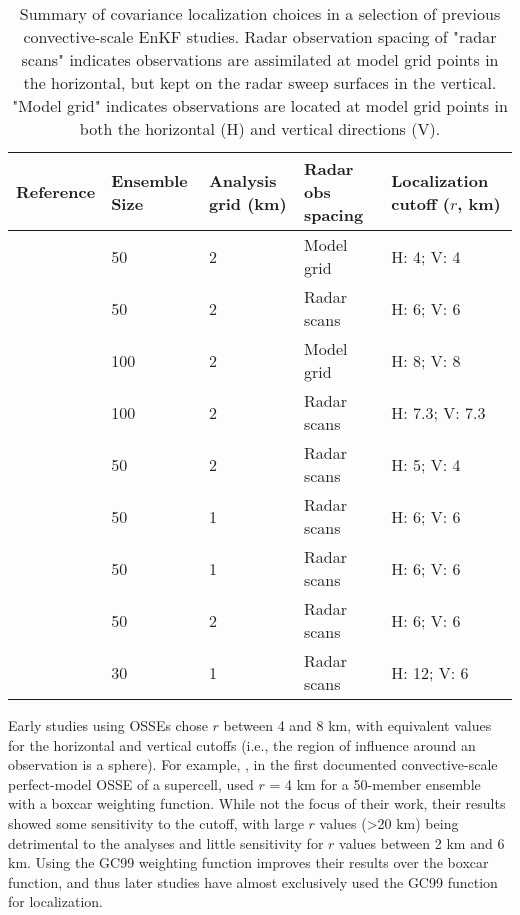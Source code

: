 \begin{table}
\centering
\begin{tabular}{ r || m{2cm} | m{1.5cm} | m{2.5cm} | m{2.5cm} }
Reference & Ensemble Size & Analysis grid (km) & Radar obs spacing & Localization cutoff (\(r\), km) \\
\hline \hline
\citet{snyderzhang03} & 50 & 2 & Model grid & H: 4; V: 4 \\
\citet{dowelletal04} & 50 & 2 & Radar scans & H: 6; V: 6 \\
\citet{tongxue05} & 100 & 2 & Model grid & H: 8; V: 8 \\
\citet{cayaetal05} & 100 & 2 & Radar scans & H: 7.3; V: 7.3 \\
\citet{aksoyetal09} & 50 & 2 & Radar scans & H: 5; V: 4 \\
\citet{dowellwicker09} & 50 & 1 & Radar scans & H: 6; V: 6 \\
\citet{dowelletal11} & 50 & 1 & Radar scans & H: 6; V: 6 \\
\citet{dongetal11} & 50 & 2 & Radar scans & H: 6; V: 6 \\
\citet{dawsonetal12} & 30 & 1 & Radar scans & H: 12; V: 6 \\
\end{tabular}
\caption{Summary of covariance localization choices in a selection of previous convective-scale EnKF studies. Radar observation spacing of "radar scans" indicates observations are assimilated at model grid points in the horizontal, but kept on the radar sweep surfaces in the vertical. "Model grid" indicates observations are located at model grid points in both the horizontal (H) and vertical directions (V).}
\label{covlocsummary}
\end{table}

Early studies using OSSEs chose \( r \) between 4 and 8 km, with equivalent values for the horizontal and vertical cutoffs (i.e., the region of influence around an observation is a sphere). For example, \citet{snyderzhang03}, in the first documented convective-scale perfect-model OSSE of a supercell, used \( r \) = 4 km for a 50-member ensemble with a boxcar weighting function. While not the focus of their work, their results showed some sensitivity to the cutoff, with large \( r \) values (\textgreater 20 km) being detrimental to the analyses and little sensitivity for \( r \) values between 2 km and 6 km. Using the GC99 weighting function improves their results over the boxcar function, and thus later studies have almost exclusively used the GC99 function for localization.

